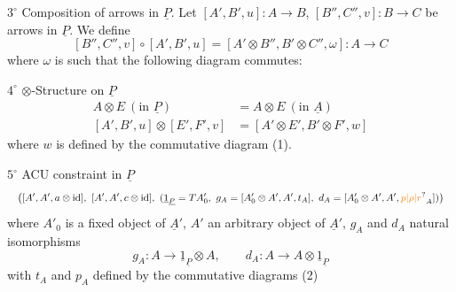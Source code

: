 $3^\circ$ Composition of arrows in $\underline P$. Let $[A',B',u]:A\to B$, $[B'',C'',v]:B\to C$ be arrows in $\underline P$. We define
\[
[B'',C'',v]\circ[A',B',u]=[A'\otimes B'',B'\otimes C'',\omega]:A\longrightarrow C
\]
where $\omega$ is such that the following diagram commutes:

$4^\circ$ $\otimes$-Structure on $\underline P$
\[
\begin{aligned}
A\otimes E\ (\text{in }\underline P)&=A\otimes E\ (\text{in }\underline A)\\
[A',B',u]\otimes[E',F',v]&=[A'\otimes E',B'\otimes F',w]
\end{aligned}
\]
where $w$ is defined by the commutative diagram (1).

$5^\circ$ ACU constraint in $\underline P$
\[
\resizebox{\linewidth}{!}{$\displaystyle
\bigl([A',A',a\otimes\mathrm{id}],\ [A',A',c\otimes\mathrm{id}],\
(\underline{1}_{\underline P}=TA'_0,\ g_A=[A'_0\otimes A',A',t_A],\
d_A=[A'_0\otimes A',A',\unsure{p|\rho|r}_A])\bigr)$}
\]
where $A'_0$ is a fixed object\unsure{,|{}} of $\underline A'$, $A'$ an arbitrary object of $\underline A'$, $g_A$ and $d_A$ natural isomorphisms
\[
g_A:A\longrightarrow\underline{1}_{\underline P}\otimes A,\qquad
d_A:A\longrightarrow A\otimes\underline{1}_{\underline P}
\]
with $t_A$ and $p_A$ defined by the commutative diagrams (2)

